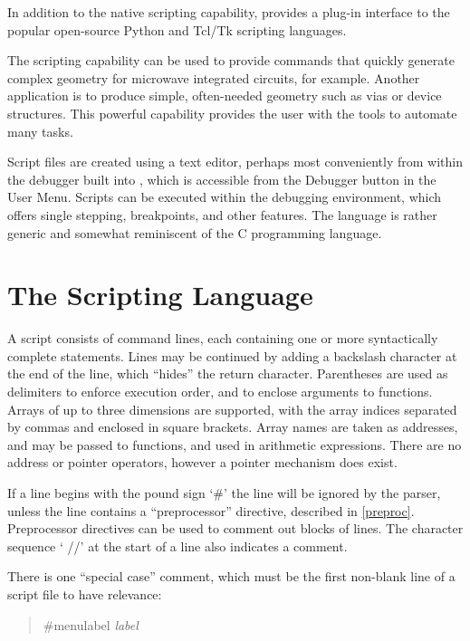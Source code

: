 In addition to the native scripting capability, {\Xic} provides a
plug-in interface to the popular open-source Python and Tcl/Tk
scripting languages. 

The scripting capability can be used to provide commands that quickly
generate complex geometry for microwave integrated circuits, for
example.  Another application is to produce simple, often-needed
geometry such as vias or device structures.  This powerful capability
provides the user with the tools to automate many tasks.

Script files are created using a text editor, perhaps most
conveniently from within the debugger built into {\Xic}, which is
accessible from the {\cb Debugger} button in the {\cb User Menu}. 
Scripts can be executed within the debugging environment, which offers
single stepping, breakpoints, and other features.  The language is
rather generic and somewhat reminiscent of the C programming language.

\section{The Scripting Language}

A script consists of command lines, each containing one or more
syntactically complete statements.  Lines may be continued by adding a
backslash character at the end of the line, which ``hides'' the return
character.  Parentheses are used as delimiters to enforce execution
order, and to enclose arguments to functions.  Arrays of up to three
dimensions are supported, with the array indices separated by commas
and enclosed in square brackets.  Array names are taken as addresses,
and may be passed to functions, and used in arithmetic expressions. 
There are no address or pointer operators, however a pointer mechanism
does exist.

If a line begins with the pound sign `{\vt \#}' the line will be
ignored by the parser, unless the line contains a ``preprocessor''
directive, described in \ref{preproc}.  Preprocessor directives can be
used to comment out blocks of lines.  The character sequence `{\vt
//}' at the start of a line also indicates a comment.

There is one ``special case'' comment, which must be the first
non-blank line of a script file to have relevance:

\begin{quote}
{\vt \#menulabel} {\it label}
\end{quote}

